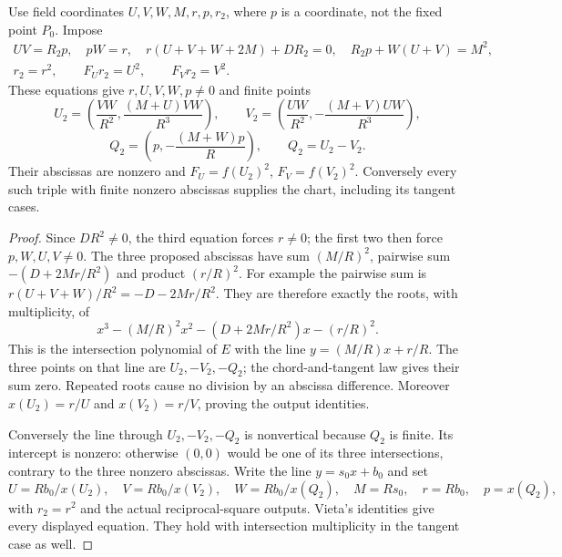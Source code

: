 \begin{lemma}\label{q198:inverse-vieta}
Use field coordinates $U,V,W,M,r,p,r_2$, where $p$ is a coordinate,
not the fixed point $P_0$. Impose
\begin{gather}
 UV=R_2p,\quad pW=r,\quad
 r(U+V+W+2M)+DR_2=0,\quad R_2p+W(U+V)=M^2,
 \label{q198:vieta-core}\\
 r_2=r^2,\qquad F_Ur_2=U^2,\qquad F_Vr_2=V^2.
 \label{q198:vieta-outputs}
\end{gather}
These equations give $r,U,V,W,p\ne0$ and finite points
\[
 U_2=\left(\frac{VW}{R^2},\frac{(M+U)VW}{R^3}\right),\qquad
 V_2=\left(\frac{UW}{R^2},-\frac{(M+V)UW}{R^3}\right),
\]
\[
                 Q_2=\left(p,-\frac{(M+W)p}{R}\right),
                 \qquad Q_2=U_2-V_2.
\]
Their abscissas are nonzero and $F_U=f(U_2)^2$, $F_V=f(V_2)^2$.
Conversely every such triple with finite nonzero abscissas supplies
the chart, including its tangent cases.
\end{lemma}
\begin{proof}
Since $DR^2\ne0$, the third equation forces $r\ne0$; the first
two then force $p,W,U,V\ne0$. The three proposed abscissas have
sum $(M/R)^2$, pairwise sum $-(D+2Mr/R^2)$ and product $(r/R)^2$.
For example the pairwise sum is
$r(U+V+W)/R^2=-D-2Mr/R^2$. They are therefore exactly the roots,
with multiplicity, of
\[
 x^3-(M/R)^2x^2-(D+2Mr/R^2)x-(r/R)^2.
\]
This is the intersection polynomial of $E$ with the line
$y=(M/R)x+r/R$. The three points on that line are
$U_2,-V_2,-Q_2$; the chord-and-tangent law gives their sum zero.
Repeated roots cause no division by an abscissa difference.
Moreover $x(U_2)=r/U$ and $x(V_2)=r/V$, proving the output identities.

Conversely the line through $U_2,-V_2,-Q_2$ is nonvertical because
$Q_2$ is finite. Its intercept is nonzero: otherwise $(0,0)$ would
be one of its three intersections, contrary to the three nonzero
abscissas. Write the line $y=s_0x+b_0$ and set
\[
 U=Rb_0/x(U_2),\quad V=Rb_0/x(V_2),\quad W=Rb_0/x(Q_2),
 \quad M=Rs_0,\quad r=Rb_0,\quad p=x(Q_2),
\]
with $r_2=r^2$ and the actual reciprocal-square outputs. Vieta's
identities give every displayed equation. They hold with intersection
multiplicity in the tangent case as well.
\end{proof}

